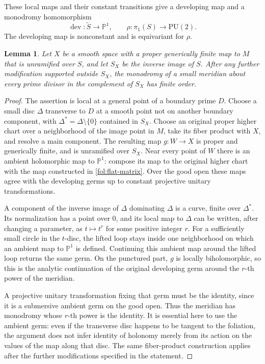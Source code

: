 \documentclass[11pt,letterpaper]{article}
\newtheorem{lemma}[theorem]{Lemma}
\theoremstyle{definition}
\theoremstyle{remark}
\begin{document}
These local maps and their constant transitions give a developing map
and a monodromy homomorphism
\begin{equation}\label{fol:developing-map}
 \operatorname{dev}\colon\widetilde S\to\mathbb{P}^1,\qquad
 \rho\colon\pi_1(S)\to\mathrm{PU}(2).
\end{equation}
The developing map is nonconstant and is equivariant for $\rho$.

\begin{lemma}\label{fol:finite-meridians}
Let $X$ be a smooth space with a proper generically finite map to $M$
that is unramified over $S$, and let $S_X$ be the inverse image of $S$.
After any further modification supported outside $S_X$, the monodromy
of a small meridian about every prime divisor in the complement of
$S_X$ has finite order.
\end{lemma}

\begin{proof}
The assertion is local at a general point of a boundary prime $D$.
Choose a small disc $\Delta$ transverse to $D$ at a smooth point not
on another boundary component, with $\Delta^*=\Delta\setminus\{0\}$
contained in $S_X$.  Choose an original proper higher chart over a
neighborhood of the image point in $M$, take its fiber product with
$X$, and resolve a main component.  The resulting map
$g\colon W\to X$ is proper and generically finite, and is unramified
over $S_X$.  Near every point of $W$ there is an ambient holomorphic
map to $\mathbb{P}^1$: compose its map to the original higher chart with the
map constructed in \eqref{fol:flat-matrix}.  Over the good open these
maps agree with the developing germs up to constant projective
unitary transformations.

A component of the inverse image of $\Delta$ dominating $\Delta$
is a curve, finite over $\Delta^*$.  Its normalization has a point over
$0$, and its local map to $\Delta$ can be written, after changing a
parameter, as $t\mapsto t^r$ for some positive integer $r$.
For a sufficiently small circle in the $t$-disc, the lifted loop stays
inside one neighborhood on which an ambient map to $\mathbb{P}^1$ is
defined.  Continuing this ambient map around the lifted loop returns
the same germ.  On the punctured part, $g$ is locally biholomorphic,
so this is the analytic continuation of the original developing germ
around the $r$-th power of the meridian.

A projective unitary transformation fixing that germ must be the
identity, since it is a submersive ambient germ on the good open.
Thus the meridian has monodromy whose $r$-th power is the identity.
It is essential here to use the ambient germ: even if the transverse
disc happens to be tangent to the foliation, the argument does not
infer identity of holonomy merely from its action on the values of
the map along that disc.  The same fiber-product construction applies
after the further modifications specified in the statement.
\end{proof}
\end{document}
